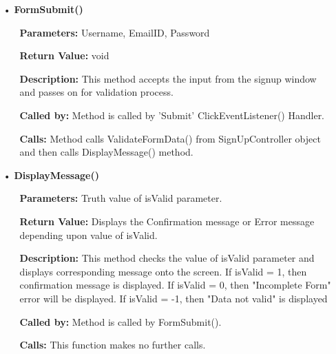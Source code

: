 \documentclass{scrreprt}
\begin{document}
\begin{enumerate}
\begin{itemize}
\item [•] \textbf{FormSubmit()}
\begin{itemize}
\item [] \textbf{Parameters:} Username, EmailID, Password
\item [] \textbf{Return Value:} void
\item [] \textbf{Description:} This method accepts the input from the signup window and passes on for validation process.
\item [] \textbf{Called by:} Method is called by 'Submit' ClickEventListener() Handler.
\item [] \textbf{Calls:} Method calls ValidateFormData() from SignUpController object and then calls DisplayMessage() method.
\end{itemize}
\item [•] \textbf{DisplayMessage()}
\begin{itemize}
\item [] \textbf{Parameters:} Truth value of isValid parameter.
\item [] \textbf{Return Value:} Displays the Confirmation message or Error message depending upon value of isValid. 
\item [] \textbf{Description:} This method checks the value of isValid parameter and displays corresponding message onto the screen. If isValid = 1, then confirmation message is displayed. If isValid = 0, then "Incomplete Form" error will be displayed. If isValid = -1, then "Data not valid" is displayed
\item [] \textbf{Called by:} Method is called by FormSubmit(). 
\item [] \textbf{Calls:} This function makes no further calls.
\end{itemize}
\end{itemize}
\end{enumerate}
\end{document}
